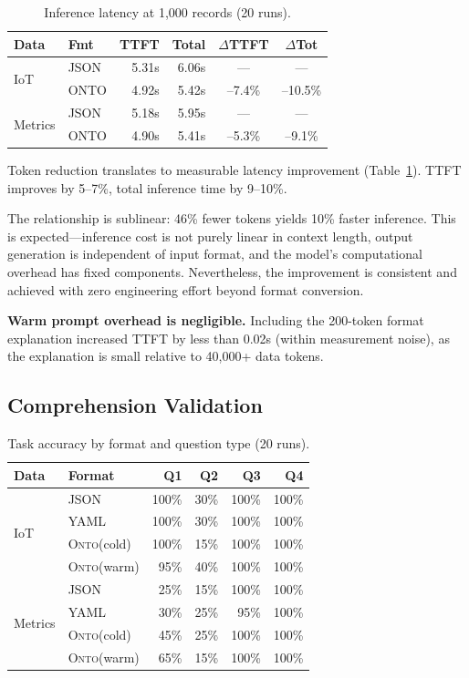 \documentclass[10pt,twocolumn]{article}
\newcommand{\onto}{\textsc{Onto}\xspace}
\begin{document}
\begin{table}[t]
\centering
\caption{Inference latency at 1,000 records (20 runs).}
\label{tab:latency}
\scriptsize
\begin{tabular}{llrrcc}
\toprule
\textbf{Data} & \textbf{Fmt} & \textbf{TTFT} & \textbf{Total} & \textbf{$\Delta$TTFT} & \textbf{$\Delta$Tot} \\
\midrule
\multirow{2}{*}{IoT} & JSON & 5.31s & 6.06s & --- & --- \\
 & ONTO & 4.92s & 5.42s & --7.4\% & --10.5\% \\
\midrule
\multirow{2}{*}{Metrics} & JSON & 5.18s & 5.95s & --- & --- \\
 & ONTO & 4.90s & 5.41s & --5.3\% & --9.1\% \\
\bottomrule
\end{tabular}
\end{table}

Token reduction translates to measurable latency improvement (Table~\ref{tab:latency}). TTFT improves by 5--7\%, total inference time by 9--10\%.

The relationship is sublinear: 46\% fewer tokens yields 10\% faster inference. This is expected---inference cost is not purely linear in context length, output generation is independent of input format, and the model's computational overhead has fixed components. Nevertheless, the improvement is consistent and achieved with zero engineering effort beyond format conversion.

\textbf{Warm prompt overhead is negligible.} Including the 200-token format explanation increased TTFT by less than 0.02s (within measurement noise), as the explanation is small relative to 40,000+ data tokens.

\subsection{Comprehension Validation}

\begin{table}[t]
\centering
\caption{Task accuracy by format and question type (20 runs).}
\label{tab:accuracy}
\scriptsize
\begin{tabular}{llrrrr}
\toprule
\textbf{Data} & \textbf{Format} & \textbf{Q1} & \textbf{Q2} & \textbf{Q3} & \textbf{Q4} \\
\midrule
\multirow{4}{*}{IoT} & JSON & 100\% & 30\% & 100\% & 100\% \\
 & YAML & 100\% & 30\% & 100\% & 100\% \\
 & \onto (cold) & 100\% & 15\% & 100\% & 100\% \\
 & \onto (warm) & 95\% & 40\% & 100\% & 100\% \\
\midrule
\multirow{4}{*}{Metrics} & JSON & 25\% & 15\% & 100\% & 100\% \\
 & YAML & 30\% & 25\% & 95\% & 100\% \\
 & \onto (cold) & 45\% & 25\% & 100\% & 100\% \\
 & \onto (warm) & 65\% & 15\% & 100\% & 100\% \\
\bottomrule
\end{tabular}
\end{table}
\end{document}
